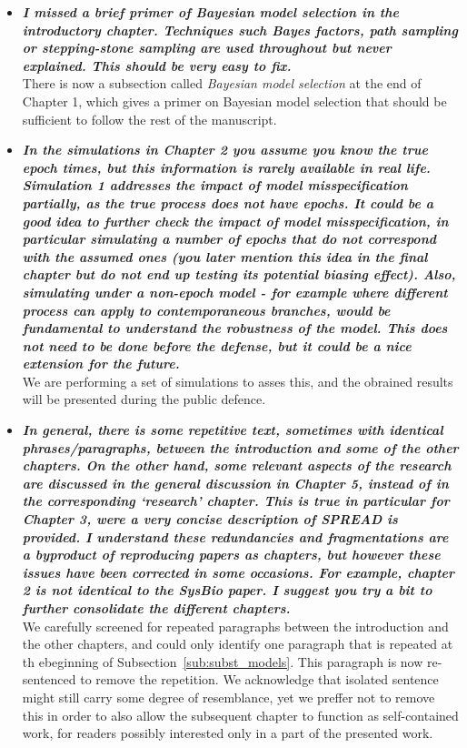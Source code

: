 \documentclass[english]{article}
\begin{document}
\begin{itemize}

\item {
{\it
\textbf{
I missed a brief primer of Bayesian model selection in the introductory chapter.
Techniques such Bayes factors, path sampling or stepping-stone sampling are used throughout but never explained. 
This should be very easy to fix.
}%
}%
}%
\\
There is now a subsection called \emph{Bayesian model selection} at the end of Chapter 1, which gives a primer on Bayesian model selection that should be sufficient to follow the rest of the manuscript.



\item {
{\it
\textbf{
In the simulations in Chapter 2 you assume you know the true epoch times, but this information is rarely available in real life. 
Simulation 1 addresses the impact of model misspecification partially, as the true process does not have epochs. 
It could be a good idea to further check the impact of model misspecification, in particular simulating a number of epochs that do not correspond with the assumed ones (you later mention this idea in the final chapter but do not end up testing its potential biasing effect). 
Also, simulating under a non-epoch model - for example where different process can apply to contemporaneous branches, would be fundamental to understand the robustness of the model. 
This does not need to be done before the defense, but it could be a nice extension for the future.
}%
}%
}%
\\
We are performing a set of simulations to asses this, and the obrained results will be presented during the public defence.


\item {
{\it
\textbf{
In general, there is some repetitive text, sometimes with identical phrases/paragraphs, between the introduction and some of the other chapters. 
On the other hand, some relevant aspects of the research are discussed in the general discussion in Chapter 5, instead of in the corresponding `research' chapter. 
This is true in particular for Chapter 3, were a very concise description of SPREAD is provided. 
I understand these redundancies and fragmentations are a byproduct of reproducing papers as chapters, but however these issues have been corrected in some occasions. 
For example, chapter 2 is not identical to the SysBio paper. 
I suggest you try a bit to further consolidate the different chapters.
}%
}%
}%
\\
We carefully screened for repeated paragraphs between the introduction and the other chapters, and could only identify one paragraph that is repeated at th ebeginning of Subsection~\ref{sub:subst_models}.
This paragraph is now re-sentenced to remove the repetition.
We acknowledge that isolated sentence might still carry some degree of resemblance, yet we preffer not to remove this in order to also allow the subsequent chapter to function as self-contained work, for readers possibly interested only in a part of the presented work.



\end{itemize}
\end{document}
